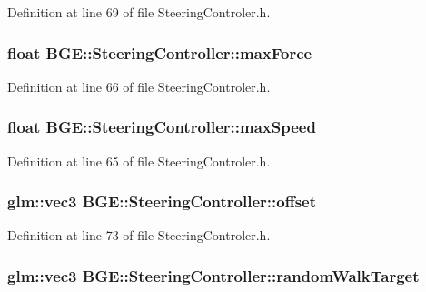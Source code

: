 Definition at line 69 of file Steering\-Controler.\-h.

\hypertarget{class_b_g_e_1_1_steering_controller_ae5cdce26a0b042668ed31e89975bd9f4}{
\subsubsection[{max\-Force}]{\setlength{\rightskip}{0pt plus 5cm}float B\-G\-E\-::\-Steering\-Controller\-::max\-Force}}\label{class_b_g_e_1_1_steering_controller_ae5cdce26a0b042668ed31e89975bd9f4}


Definition at line 66 of file Steering\-Controler.\-h.

\hypertarget{class_b_g_e_1_1_steering_controller_abd6d971966780e0bcd3f8f8354cf816d}{
\subsubsection[{max\-Speed}]{\setlength{\rightskip}{0pt plus 5cm}float B\-G\-E\-::\-Steering\-Controller\-::max\-Speed}}\label{class_b_g_e_1_1_steering_controller_abd6d971966780e0bcd3f8f8354cf816d}


Definition at line 65 of file Steering\-Controler.\-h.

\hypertarget{class_b_g_e_1_1_steering_controller_ae105c8426aa2bf9856ea0e53d95a366c}{
\subsubsection[{offset}]{\setlength{\rightskip}{0pt plus 5cm}glm\-::vec3 B\-G\-E\-::\-Steering\-Controller\-::offset}}\label{class_b_g_e_1_1_steering_controller_ae105c8426aa2bf9856ea0e53d95a366c}


Definition at line 73 of file Steering\-Controler.\-h.

\hypertarget{class_b_g_e_1_1_steering_controller_a73ebb24f070f82ea198c6ee7d2713730}{
\subsubsection[{random\-Walk\-Target}]{\setlength{\rightskip}{0pt plus 5cm}glm\-::vec3 B\-G\-E\-::\-Steering\-Controller\-::random\-Walk\-Target}}\label{class_b_g_e_1_1_steering_controller_a73ebb24f070f82ea198c6ee7d2713730}


